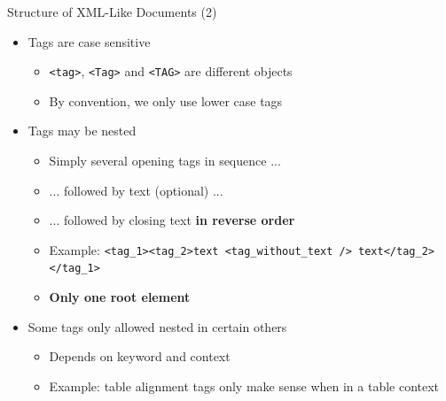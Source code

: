 \begin{frame}{Structure of XML-Like Documents (2)}
%
\begin{itemize}
\item Tags are case sensitive
	\begin{itemize}
	\item \texttt{<tag>}, \texttt{<Tag>} and \texttt{<TAG>} are different objects
	\item By convention, we only use lower case tags
	\end{itemize}
\pause
\item Tags may be nested
	\begin{itemize}
	\item Simply several opening tags in sequence ...
	\item ... followed by text (optional) ...
	\item ... followed by closing text \textbf{in reverse order}
	\item Example:
		\texttt{{\color{blue}<tag\_1>}{\color{red}<tag\_2>}text {\color{green}<tag\_without\_text />} {\color{red}text</tag\_2>}{\color{blue}</tag\_1>}}
	\item \textbf{Only one root element}
	\end{itemize}
\pause
\item Some tags only allowed nested in certain others
	\begin{itemize}
	\item Depends on keyword and context
	\item Example: table alignment tags only make sense when in a table context
	\end{itemize}
\end{itemize}
%
\end{frame}



